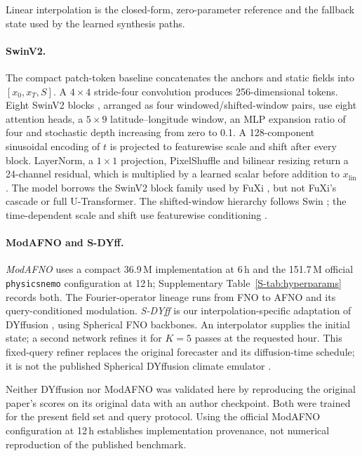 \documentclass[referee,lineno,pdflatex,sn-nature]{sn-jnl}
\begin{document}
\begin{deferredmethodsintro}
Linear interpolation is the closed-form, zero-parameter reference and
the fallback state used by the learned synthesis paths.

\paragraph{SwinV2.}
The compact patch-token baseline concatenates the anchors and static fields
into $[x_0,x_T,S]$. A $4\times4$ stride-four convolution produces
256-dimensional tokens. Eight SwinV2 blocks \cite{liu2022swinv2}, arranged as
four windowed/shifted-window pairs, use eight attention heads, a $5\times9$
latitude--longitude window, an MLP expansion ratio of four and stochastic
depth increasing from zero to 0.1. A 128-component sinusoidal encoding of $t$
is projected to featurewise scale and shift after every block. LayerNorm, a
$1\times1$ projection, PixelShuffle and bilinear resizing return a 24-channel
residual, which is multiplied by a learned scalar before addition to
$x_{\mathrm{lin}}$. The model borrows the SwinV2 block family used by FuXi
\cite{chen2023fuxi}, but not FuXi's cascade or full U-Transformer.
The shifted-window hierarchy follows Swin \cite{liu2021swin}; the
time-dependent scale and shift use featurewise conditioning
\cite{perez2018film}.

\paragraph{ModAFNO and S-DYff.}
\emph{ModAFNO}
\cite{leinonen2024modafno,guibas2022afno} uses a compact 36.9\,M
implementation at 6\,h and the 151.7\,M official \texttt{physicsnemo}
configuration at 12\,h; Supplementary Table~\ref{S-tab:hyperparams} records
both.
The Fourier-operator lineage runs from FNO \cite{li2021fno} to AFNO and its
query-conditioned modulation. \emph{S-DYff} is our interpolation-specific
adaptation of DYffusion \cite{cachay2023dyffusion}, using Spherical FNO
\cite{bonev2023sfno} backbones. An interpolator supplies the initial state;
a second network refines it for $K{=}5$ passes at the requested hour. This
fixed-query refiner replaces the original forecaster and its diffusion-time
schedule; it is not the published Spherical DYffusion climate emulator
\cite{cachay2024spherical}.

Neither DYffusion nor ModAFNO was validated here by reproducing the original
paper's scores on its original data with an author checkpoint. Both were
trained for the present field set and query protocol. Using the official
ModAFNO configuration at 12\,h establishes implementation provenance, not
numerical reproduction of the published benchmark.


\end{deferredmethodsintro}
\end{document}
